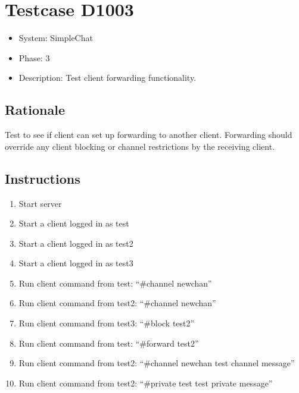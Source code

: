 \documentclass[12pt]{article}
\begin{document}
\section{Testcase D1003}
\begin{itemize}
\item System: SimpleChat
\item Phase: 3
\item Description: Test client forwarding functionality.
\end{itemize}

\subsection*{Rationale}
Test to see if client can set up forwarding to another client. Forwarding should override any client blocking or channel restrictions by the receiving client.

\subsection*{Instructions}
\begin{enumerate}
\item Start server
\item Start a client logged in as test
\item Start a client logged in as test2
\item Start a client logged in as test3
\item Run client command from test: ``\#channel newchan''
\item Run client command from test2: ``\#channel newchan''
\item Run client command from test3: ``\#block test2''
\item Run client command from test: ``\#forward test2''
\item Run client command from test2: ``\#channel newchan test channel message''
\item Run client command from test2: ``\#private test test private message''
\end{enumerate}
\end{document}
